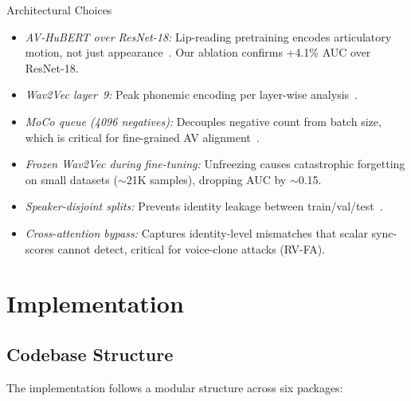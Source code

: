 \documentclass[12pt, letterpaper]{article}
\begin{document}
\begin{resultbox}{Architectural Choices}
\begin{itemize}[leftmargin=1.5em, topsep=0pt]
    \item \textit{AV-HuBERT over ResNet-18:} Lip-reading pretraining encodes articulatory motion, not just appearance~\cite{shi2022}. Our ablation confirms +4.1\% AUC over ResNet-18.
    \item \textit{Wav2Vec layer~9:} Peak phonemic encoding per layer-wise analysis~\cite{pasad2021}.
    \item \textit{MoCo queue (4096 negatives):} Decouples negative count from batch size, which is critical for fine-grained AV alignment~\cite{he2020}.
    \item \textit{Frozen Wav2Vec during fine-tuning:} Unfreezing causes catastrophic forgetting on small datasets ($\sim$21K samples), dropping AUC by $\sim$0.15.
    \item \textit{Speaker-disjoint splits:} Prevents identity leakage between train/val/test~\cite{khalid2021}.
    \item \textit{Cross-attention bypass:} Captures identity-level mismatches that scalar sync-scores cannot detect, critical for voice-clone attacks (RV-FA).
\end{itemize}
\end{resultbox}

\section{Implementation}

\subsection{Codebase Structure}

The implementation follows a modular structure across six packages:
\end{document}
